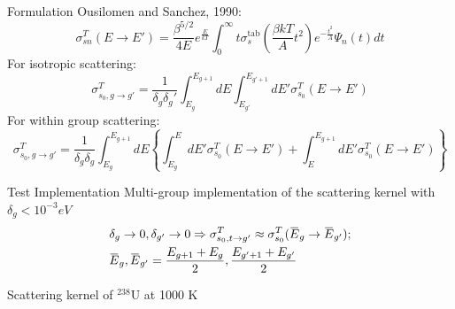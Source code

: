 \documentclass[sans,mathserif,aspectratio=169]{beamer}
\newcommand{\overbar}[1]{\mkern 1.5mu\overline{\mkern-1.5mu#1\mkern-1.5mu}\mkern 1.5mu}
\newcommand*\mean[1]{\overbar{#1}}
\begin{document}
\begin{frame}{Formulation}
Ousilomen and Sanchez, 1990:
\begin{equation*}
\sigma_{sn}^T (E \to E') = \frac{\beta^{5/2}}{4E} e^{\frac{E}{kT}} \int_0^\infty t \sigma_s^{\text{tab}} \left( \frac{\beta k T}{A} t^2 \right)
e^{-\frac{t^2}{A}} \Psi_n (t) dt
\end{equation*}
\pause
For isotropic scattering:
\begin{equation*}
\sigma_{s_0, g \to g'}^T = \frac{1}{\delta_g \delta_g'} \int_{E_{g}}^{E_{g+1}} dE \int_{E_{g'}}^{E_{g'+1}} dE' \sigma_{s_0}^T (E \to E')
\end{equation*}
\pause
For within group scattering:
\begin{equation*}
\sigma_{s_0, g \to g'}^T = \frac{1}{\delta_g \delta_g} \int_{E_{g}}^{E_{g+1}} dE \left\{  \int_{E_{g}}^{E} dE' \sigma_{s_0}^T (E \to E') + \int_{E}^{E_{g+1}} dE' \sigma_{s_0}^T (E \to E') \right\}
\end{equation*}
\end{frame}

\begin{frame}{Test Implementation}
Multi-group implementation of the scattering kernel with $\delta_g < 10^{-3} eV$
\begin{align*}
&\delta_g \to 0, \delta_{g'} \to 0 \Rightarrow \sigma_{s_0, t \to g'}^T \approx \sigma_{s_0}^T (\mean{E}_g \to \mean{E}_{g'}); \\
& \mean{E}_g,  \mean{E}_{g'} = \frac{E_{g+1} + E_g}{2}, \frac{E_{g'+1} + E_{g'}}{2}
\end{align*}
\end{frame}

\begin{frame}{Scattering kernel of $^{238}$U at 1000 K }
\centering
{}
\end{frame}
\end{document}
